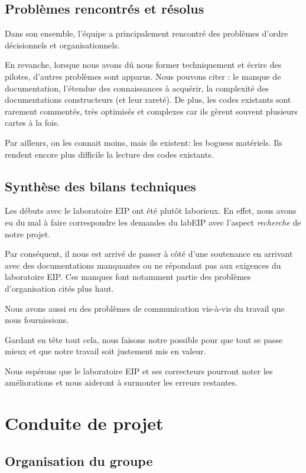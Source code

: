 \documentclass[francais]{rtxreport}
\begin{document}
\section{Problèmes rencontrés et résolus}

Dans son ensemble, l'équipe a principalement rencontré des problèmes d'ordre
décisionnels et organisationnels.

En revanche, lorsque nous avons dû nous former techniquement et écrire des
pilotes, d'autres problèmes sont apparus. Nous pouvons citer : le manque de
documentation, l’étendue des connaissances à acquérir, la complexité des
documentations constructeurs (et leur rareté). De plus, les codes existants sont
rarement commentés, très optimisés et complexes car ils gèrent souvent
plusieurs cartes à la fois.

Par ailleurs, on les connait moins, mais ils existent: les boguess
matériels. Ils rendent encore plus difficile la lecture des codes existants.

\section{Synthèse des bilans techniques}

Les débuts avec le laboratoire EIP ont été plutôt laborieux. En effet, nous
avons eu du mal à faire correspondre les demandes du labEIP avec l'aspect
\emph{recherche} de notre projet.

Par conséquent, il nous est arrivé de passer à côté d’une soutenance en arrivant
avec des documentations manquantes ou ne répondant pas aux exigences du
laboratoire EIP. Ces manques font notamment partie des problèmes d'organisation
cités plus haut.

Nous avons aussi eu des problèmes de communication vis-à-vis du travail que nous
fournissions.

Gardant en tête tout cela, nous faisons notre possible pour que tout se passe
mieux et que notre travail soit justement mis en valeur.

Nous espérons que le laboratoire EIP et ses correcteurs pourront noter les
améliorations et nous aideront à surmonter les erreurs restantes.

\chapter{Conduite de projet}

\section{Organisation du groupe}
\end{document}
